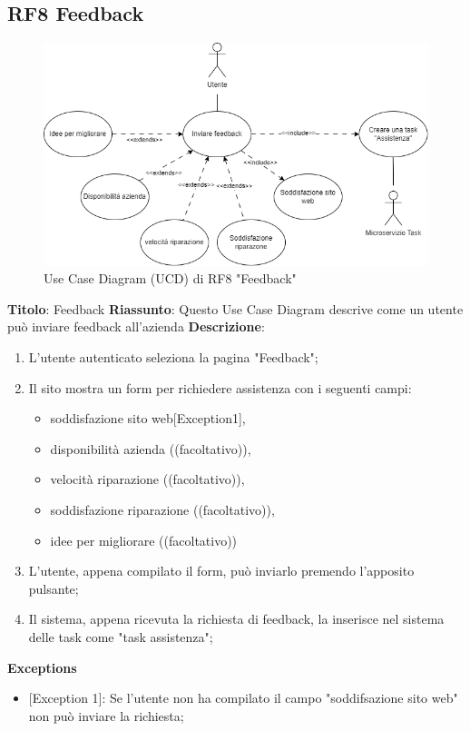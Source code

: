 \documentclass{report}
\begin{document}
\subsection*{RF8 Feedback}

\begin{figure}[H]
	\centering\includegraphics[width=1\textwidth]{images/UCD/RF8_feedback_UCD.png}
	Use Case Diagram (UCD) di RF8 "Feedback"
\end{figure}
\textbf{Titolo}: Feedback\newline
\textbf{Riassunto}: Questo Use Case Diagram descrive come un utente può inviare feedback all'azienda  \newline
\textbf{Descrizione}:
	\begin{enumerate}
		\item L'utente autenticato seleziona la pagina "Feedback";
		\item Il sito mostra un form per richiedere assistenza con i seguenti campi:
		\begin{itemize}
			\item soddisfazione sito web[Exception1],
			\item disponibilità azienda ((facoltativo)),
			\item velocità riparazione ((facoltativo)),
			\item soddisfazione riparazione ((facoltativo)),
			\item idee per migliorare ((facoltativo))
		\end{itemize}
		\item L'utente, appena compilato il form, può inviarlo premendo l'apposito pulsante;
		\item Il sistema, appena ricevuta la richiesta di feedback, la inserisce nel sistema delle task come "task assistenza";
		
	\end{enumerate}
\textbf{Exceptions}
\begin{itemize}
	\item {[Exception 1]}: Se l'utente non ha compilato il campo "soddifsazione sito web" non può inviare la richiesta;
\end{itemize}
\end{document}
